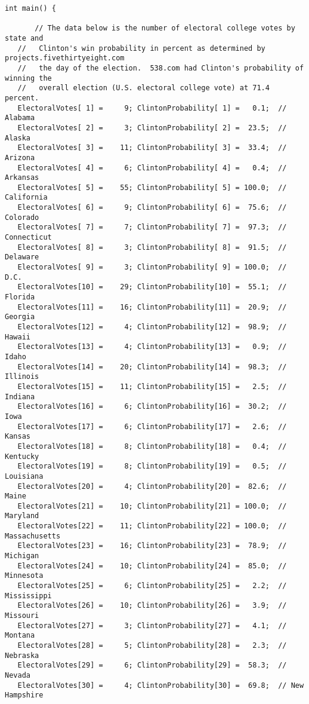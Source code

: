 \documentclass{report}
\begin{document}
\begin{lstlisting}
int main() {

       // The data below is the number of electoral college votes by state and
   //   Clinton's win probability in percent as determined by projects.fivethirtyeight.com
   //   the day of the election.  538.com had Clinton's probability of winning the
   //   overall election (U.S. electoral college vote) at 71.4 percent.
   ElectoralVotes[ 1] =     9; ClintonProbability[ 1] =   0.1;  // Alabama
   ElectoralVotes[ 2] =     3; ClintonProbability[ 2] =  23.5;  // Alaska
   ElectoralVotes[ 3] =    11; ClintonProbability[ 3] =  33.4;  // Arizona
   ElectoralVotes[ 4] =     6; ClintonProbability[ 4] =   0.4;  // Arkansas
   ElectoralVotes[ 5] =    55; ClintonProbability[ 5] = 100.0;  // California
   ElectoralVotes[ 6] =     9; ClintonProbability[ 6] =  75.6;  // Colorado
   ElectoralVotes[ 7] =     7; ClintonProbability[ 7] =  97.3;  // Connecticut
   ElectoralVotes[ 8] =     3; ClintonProbability[ 8] =  91.5;  // Delaware
   ElectoralVotes[ 9] =     3; ClintonProbability[ 9] = 100.0;  // D.C.
   ElectoralVotes[10] =    29; ClintonProbability[10] =  55.1;  // Florida
   ElectoralVotes[11] =    16; ClintonProbability[11] =  20.9;  // Georgia
   ElectoralVotes[12] =     4; ClintonProbability[12] =  98.9;  // Hawaii
   ElectoralVotes[13] =     4; ClintonProbability[13] =   0.9;  // Idaho
   ElectoralVotes[14] =    20; ClintonProbability[14] =  98.3;  // Illinois
   ElectoralVotes[15] =    11; ClintonProbability[15] =   2.5;  // Indiana
   ElectoralVotes[16] =     6; ClintonProbability[16] =  30.2;  // Iowa
   ElectoralVotes[17] =     6; ClintonProbability[17] =   2.6;  // Kansas
   ElectoralVotes[18] =     8; ClintonProbability[18] =   0.4;  // Kentucky
   ElectoralVotes[19] =     8; ClintonProbability[19] =   0.5;  // Louisiana
   ElectoralVotes[20] =     4; ClintonProbability[20] =  82.6;  // Maine
   ElectoralVotes[21] =    10; ClintonProbability[21] = 100.0;  // Maryland
   ElectoralVotes[22] =    11; ClintonProbability[22] = 100.0;  // Massachusetts
   ElectoralVotes[23] =    16; ClintonProbability[23] =  78.9;  // Michigan
   ElectoralVotes[24] =    10; ClintonProbability[24] =  85.0;  // Minnesota
   ElectoralVotes[25] =     6; ClintonProbability[25] =   2.2;  // Mississippi
   ElectoralVotes[26] =    10; ClintonProbability[26] =   3.9;  // Missouri
   ElectoralVotes[27] =     3; ClintonProbability[27] =   4.1;  // Montana
   ElectoralVotes[28] =     5; ClintonProbability[28] =   2.3;  // Nebraska
   ElectoralVotes[29] =     6; ClintonProbability[29] =  58.3;  // Nevada
   ElectoralVotes[30] =     4; ClintonProbability[30] =  69.8;  // New Hampshire

\end{lstlisting}
\end{document}

